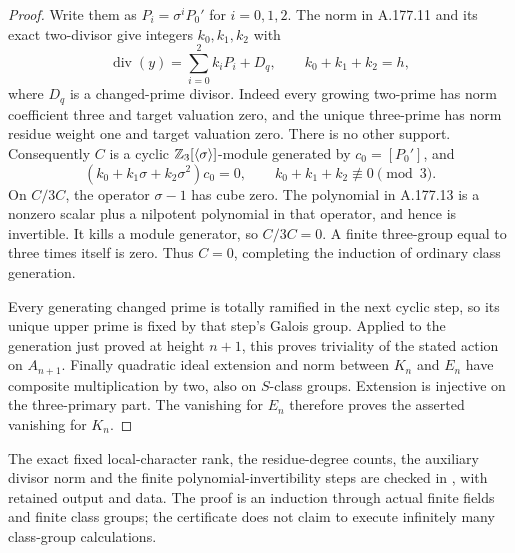 \begin{proof}
Write them as $P_i=\sigma^iP_0'$ for $i=0,1,2$.
The norm in A.177.11 and its exact two-divisor give integers
$k_0,k_1,k_2$ with
\[
 \operatorname{div}(y)=\sum_{i=0}^2k_iP_i+D_q,
       \qquad k_0+k_1+k_2=h,
\tag{A.177.12}
\]
where $D_q$ is a changed-prime divisor.  Indeed every growing
two-prime has norm coefficient three and target valuation zero,
and the unique three-prime has norm residue weight one and target
valuation zero.  There is no other support.
Consequently $C$ is a cyclic $\mathbb Z_3[\langle\sigma\rangle]$-module
generated by $c_0=[P_0']$, and
\[
          (k_0+k_1\sigma+k_2\sigma^2)c_0=0,
                    \qquad k_0+k_1+k_2\not\equiv0\pmod3.
\tag{A.177.13}
\]
On $C/3C$, the operator $\sigma-1$ has cube zero.
The polynomial in A.177.13 is a nonzero scalar plus a nilpotent
polynomial in that operator, and hence is invertible.
It kills a module generator, so $C/3C=0$.
A finite three-group equal to three times itself is zero.
Thus $C=0$, completing the induction of ordinary class generation.

Every generating changed prime is totally ramified in the next
cyclic step, so its unique upper prime is fixed by that step's
Galois group.  Applied to the generation just proved at height
$n+1$, this proves triviality of the stated action on $A_{n+1}$.
Finally quadratic ideal extension and norm between $K_n$ and
$E_n$ have composite multiplication by two, also on $S$-class
groups.  Extension is injective on the three-primary part.
The vanishing for $E_n$ therefore proves the asserted vanishing
for $K_n$.
\end{proof}

The exact fixed local-character rank, the residue-degree counts,
the auxiliary divisor norm and the finite polynomial-invertibility
steps are checked in
, with retained
output and data.  The proof is an induction through actual finite
fields and finite class groups; the certificate does not claim to
execute infinitely many class-group calculations.
